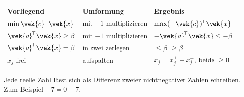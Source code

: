 \begin{merksatz}
\begin{center}
{\small
\renewcommand{\arraystretch}{1.55}
\begin{tabular}{@{}P{2.6cm}P{3.0cm}P{2.8cm}@{}}
\toprule
\textbf{Vorliegend} & \textbf{Umformung} & \textbf{Ergebnis}\\
\midrule
$\min \vek{c}^{\!\top}\vek{x}$ & mit $-1$ multiplizieren & $\max (-\vek{c})^{\!\top}\vek{x}$\\
$\vek{a}^{\!\top}\vek{x} \ge \beta$ & mit $-1$ multiplizieren & $-\vek{a}^{\!\top}\vek{x} \le -\beta$\\
$\vek{a}^{\!\top}\vek{x} = \beta$ & in zwei zerlegen & $\le\beta$  $\ge\beta$\\
$x_j$ frei & aufspalten & $x_j = x_j^{+}-x_j^{-}$, beide $\ge 0$\\
\bottomrule
\end{tabular}}
\end{center}

Jede reelle Zahl lässt sich als Differenz zweier nichtnegativer Zahlen schreiben. Zum Beispiel $-7 = 0 - 7$.

\begin{center}
\begin{minipage}{0.88\textwidth}
\end{minipage}
\end{center}
\end{merksatz}

